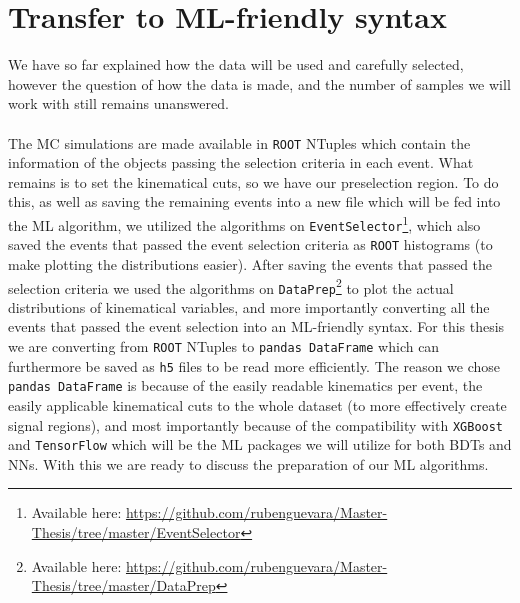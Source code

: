 \documentclass[12pt, a4paper]{book}
\begin{document}
\section{Transfer to ML-friendly syntax}
We have so far explained how the data will be used and carefully selected, however the question of how the data is made, and the number of samples we will work with still remains unanswered. \\
\\The MC simulations are made available in \verb|ROOT| \cite{ROOT} NTuples which contain the information of the objects passing the selection criteria in each event. What remains is to set the kinematical cuts, so we have our preselection region. 
To do this, as well as saving the remaining events into a new file which will be fed into the ML algorithm, we utilized the algorithms on \verb|EventSelector|\footnote{Available here: \href{https://github.com/rubenguevara/Master-Thesis/tree/master/EventSelector}{https://github.com/rubenguevara/Master-Thesis/tree/master/EventSelector}}, 
which also saved the events that passed the event selection criteria as \verb|ROOT| histograms (to make plotting the distributions easier). After saving the events that passed the selection criteria we used the algorithms on \verb|DataPrep|\footnote{Available here: \href{https://github.com/rubenguevara/Master-Thesis/tree/master/DataPrep}{https://github.com/rubenguevara/Master-Thesis/tree/master/DataPrep}} 
to plot the actual distributions of kinematical variables, and more importantly converting all the events that passed the event selection into an ML-friendly syntax. For this thesis we are converting from \verb|ROOT| NTuples to \verb|pandas DataFrame| \cite{pd.DataFrame} 
which can furthermore be saved as \verb|h5| files to be read more efficiently. The reason we chose \verb|pandas DataFrame| is because of the easily readable kinematics per event, the easily applicable kinematical cuts to the whole dataset 
(to more effectively create signal regions), and most importantly because of the compatibility with \verb|XGBoost| \cite{XGBoost} and \verb|TensorFlow| \cite{TensorFlow} which will be the ML packages we will utilize for both BDTs and NNs. 
With this we are ready to discuss the preparation of our ML algorithms.

\end{document}

